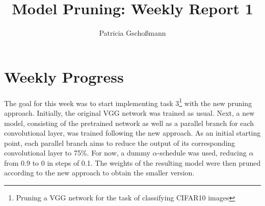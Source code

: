 \documentclass[10pt,twocolumn,letterpaper]{article}
\begin{document}
\title{Model Pruning: Weekly Report 1}
\author{Patricia Gschoßmann}

\maketitle

\section{Weekly Progress}
The goal for this week was to start implementing task 3\footnote{Pruning a VGG network for the task of classifying CIFAR10 images} with the new pruning approach.
Initially, the original VGG network was trained as usual.
Next, a new model, consisting of the pretrained network as well as a parallel branch for each convolutional layer, was trained following the new approach.
As an initial starting point, each parallel branch aims to reduce the output of its corresponding convolutional layer to 75\%.
For now, a dummy $\alpha$-schedule was used, reducing $\alpha$ from 0.9 to 0 in steps of 0.1.
The weights of the resulting model were then pruned according to the new approach to obtain the smaller version.
\end{document}
